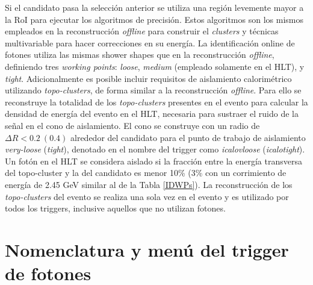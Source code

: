 Si el candidato pasa la selección anterior se utiliza una región levemente mayor a la RoI para ejecutar los algoritmos de precisión. Estos algoritmos son los mismos empleados en la reconstrucción \textit{offline} \cite{Lampl:1099735} para construir el \textit{clusters} y técnicas multivariable \cite{PERF-2017-03} para hacer correcciones en su energía. La identificación online de fotones utiliza las mismas shower shapes que en la reconstrucción \textit{offline}, definiendo tres \textit{working points}: \textit{loose}, \textit{medium} (empleado solamente en el HLT), y \textit{tight}.
Adicionalmente es posible incluir requisitos de aislamiento calorimétrico utilizando \textit{topo-clusters}, de forma similar a la reconstrucción \textit{offline}. Para ello se reconstruye la totalidad de los \textit{topo-clusters} presentes en el evento para calcular la densidad de energía del evento en el HLT, necesaria para sustraer el ruido de la señal en el cono de aislamiento. El cono se construye con un radio de  $\Delta R < 0.2\:(0.4)$ alrededor del candidato para el punto de trabajo de aislamiento \textit{very-loose} (\textit{tight}), denotado en el nombre del trigger como \textit{icalovloose} (\textit{icalotight}). Un fotón en el HLT se considera aislado si la fracción entre la energía transversa del topo-cluster y la del candidato es menor
10\% (3\% con un corrimiento de energía de 2.45 GeV similar al de la Tabla \ref{IDWPs}). La reconstrucción de los \textit{topo-clusters} del evento se realiza una sola vez en el evento y es utilizado por todos los triggers, inclusive aquellos que no utilizan fotones.

\section{Nomenclatura y menú del trigger de fotones}




